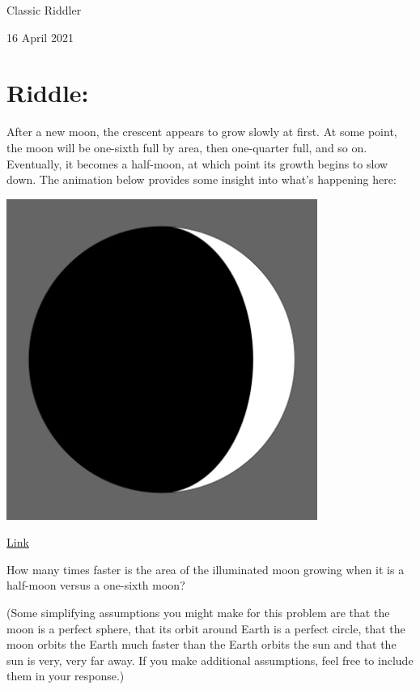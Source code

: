 \documentclass{article}
\begin{document}
\pagestyle{empty} %

\begin{center}
{\LARGE Classic Riddler}

\vspace{0.15in}

{\Large 16 April 2021}
\end{center}


\section*{Riddle:}

After a new moon, the crescent appears to grow slowly at first.
At some point, the moon will be one-sixth full by area, then one-quarter full, and so on.
Eventually, it becomes a half-moon, at which point its growth begins to slow down.
The animation below provides some insight into what's happening here:

\vspace{0.1in}
\begin{center}
\includegraphics[width=4in]{moon_still.png}
\end{center}
\href{https://fivethirtyeight.com/wp-content/uploads/2021/04/moon_538.gif}{Link}
\vspace{0.1in}

How many times faster is the area of the illuminated moon growing when it is a half-moon versus a one-sixth moon?

(Some simplifying assumptions you might make for this problem are that the moon is a perfect sphere, that its orbit around Earth is a perfect circle, that the moon orbits the Earth much faster than the Earth orbits the sun and that the sun is very, very far away.
If you make additional assumptions, feel free to include them in your response.)
\end{document}
